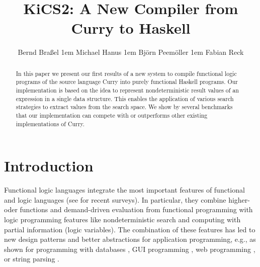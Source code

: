 \documentclass{llncs}
\begin{document}
\pagestyle{plain}
\sloppy

\title{KiCS2: A New Compiler from Curry to Haskell}

\author{
Bernd Bra{\ss}el
\kern1em
Michael Hanus
\kern1em
Bj{\"o}rn Peem{\"o}ller
\kern1em
Fabian Reck
}

\maketitle

\begin{abstract}
In this paper we present our first results of a new system
to compile functional logic programs of the source language Curry
into purely functional Haskell programs.
Our implementation is based on the idea to represent
nondeterministic result values of an expression in a single data structure.
This enables the application of various search strategies
to extract values from the search space.
We show by several benchmarks that our implementation
can compete with or outperforms other existing implementations of Curry.
\end{abstract}


\section{Introduction}
\label{sec:Introduction}

Functional logic languages integrate the most important
features of functional and logic languages
(see \cite{AntoyHanus10CACM,Hanus07ICLP} for recent surveys).
In particular, they combine higher-oder functions and demand-driven
evaluation from functional programming with logic programming features
like nondeterministic search and computing with partial information
(logic variables).
The combination of these features
has led to new design patterns \cite{AntoyHanus02FLOPS}
and better abstractions for application programming,
e.g., as shown for programming with databases
\cite{BrasselHanusMueller08PADL,Fischer05},
GUI programming \cite{Hanus00PADL},
web programming \cite{Hanus01PADL,Hanus06PPDP,HanusKoschnicke10PADL},
or string parsing \cite{CaballeroLopez99}.
\end{document}
